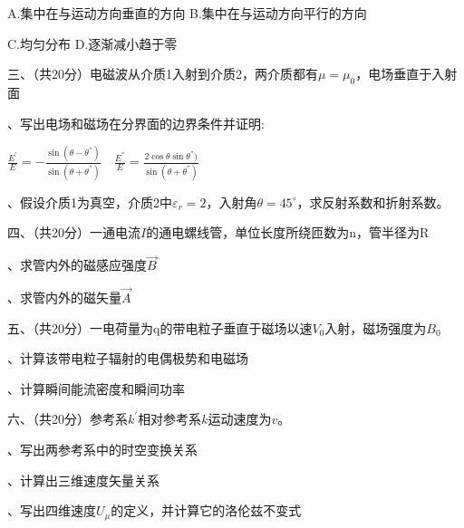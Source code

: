 A.\hspace{0.8em}集中在与运动方向垂直的方向\hspace{5em}
B.\hspace{0.8em}集中在与运动方向平行的方向\vspace{0.1cm}

C.\hspace{0.8em}均匀分布\hspace{14em}
D.\hspace{0.8em}逐渐减小趋于零\vspace{1cm}

\noindent
三、\hspace{0.2em}（共20分）电磁波从介质1入射到介质2，两介质都有$\mu = \mu_0$，电场垂直于入射面\vspace{0.2cm}

、写出电场和磁场在分界面的边界条件并证明:\vspace{0.2cm}

$\displaystyle{ \frac{ E^{'} }{ E } = - \frac{ \sin (\theta - \theta^{''} ) }{ \sin (\theta + \theta^{''} ) } } \quad \displaystyle{ \frac{ E^{''} }{ E } =  \frac{ 2 \cos \theta \sin \theta^{''} ) }{ \sin (\theta + \theta^{''} ) } }$\vspace{0.2cm}

、假设介质1为真空，介质2中$\varepsilon_r = 2$，入射角$\theta = 45^{\circ}$，求反射系数和折射系数。\vspace{3cm}

\noindent
四、\hspace{0.2em}（共20分）一通电流$I$的通电螺线管，单位长度所绕匝数为n，管半径为R\vspace{0.2cm}

、求管内外的磁感应强度$\Vec{B}$\vspace{0.2cm}

、求管内外的磁矢量$\Vec{A}$
\vspace{3cm}

\noindent
五、\hspace{0.2em}（共20分）一电荷量为q的带电粒子垂直于磁场以速$V_0$入射，磁场强度为$B_0$
\vspace{0.2cm}

、计算该带电粒子辐射的电偶极势和电磁场
\vspace{0.2cm}

、计算瞬间能流密度和瞬间功率\vspace{3cm}


\noindent
六、\hspace{0.2em}（共20分）参考系$k^{'}$相对参考系$k$运动速度为$v$。
\vspace{0.2cm}

、写出两参考系中的时空变换关系
\vspace{0.2cm}

、计算出三维速度矢量关系
\vspace{0.2cm}

、写出四维速度$U_{\mu}$的定义，并计算它的洛伦兹不变式
